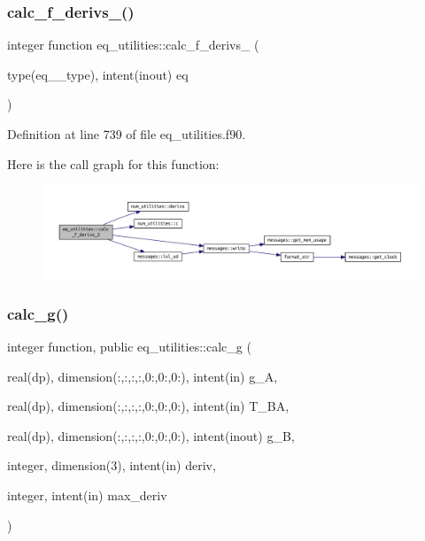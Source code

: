 \subsubsection{\texorpdfstring{calc\+\_\+f\+\_\+derivs\+\_()}{calc\_f\_derivs\_2()}}
{\footnotesize\ttfamily integer function eq\+\_\+utilities\+::calc\+\_\+f\+\_\+derivs\+\_ (\begin{DoxyParamCaption}\item[{type(eq\+\_\+2\+\_\+type), intent(inout)}]{eq }\end{DoxyParamCaption})}



Definition at line 739 of file eq\+\_\+utilities.\+f90.

Here is the call graph for this function\+:
\nopagebreak
\begin{figure}[H]
\begin{center}
\leavevmode
\includegraphics[width=350pt]{namespaceeq__utilities_a9e8269c4f0a20b8b9622fbe8739ba1a8_cgraph}
\end{center}
\end{figure}
\mbox{\label{namespaceeq__utilities_a1426f7226577f8719472265fd882fbf4}} 
\subsubsection{\texorpdfstring{calc\+\_\+g()}{calc\_g()}}
{\footnotesize\ttfamily integer function, public eq\+\_\+utilities\+::calc\+\_\+g (\begin{DoxyParamCaption}\item[{real(dp), dimension(\+:,\+:,\+:,\+:,0\+:,0\+:,0\+:), intent(in)}]{g\+\_\+A,  }\item[{real(dp), dimension(\+:,\+:,\+:,\+:,0\+:,0\+:,0\+:), intent(in)}]{T\+\_\+\+BA,  }\item[{real(dp), dimension(\+:,\+:,\+:,\+:,0\+:,0\+:,0\+:), intent(inout)}]{g\+\_\+B,  }\item[{integer, dimension(3), intent(in)}]{deriv,  }\item[{integer, intent(in)}]{max\+\_\+deriv }\end{DoxyParamCaption})}



